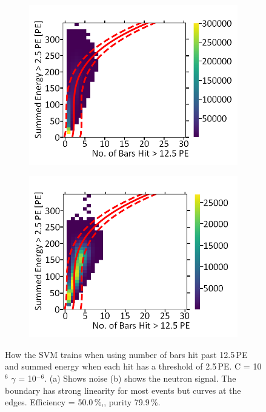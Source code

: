 \begin{figure}[!h]
\centering
\begin{subfigure}{.5\textwidth}
  \centering
  \includegraphics[width=\linewidth]{Appendix1/Figs/Bars2Sum1Noise.png}
  \captionsetup{width=.9\linewidth}
  \caption{}
  \label{subFig:Bars2Sum1Noise}
\end{subfigure}%
\begin{subfigure}{.5\textwidth}
  \centering
\includegraphics[width=\linewidth]{Appendix1/Figs/Bars2Sum1Signal.png}
  \captionsetup{width=.9\linewidth}
  \caption{}
  \label{subFig:Bars2Sum1Signal}
\end{subfigure}
\caption[LIBLINEAR SVM Nyström approximated RBF kernel for number of bars hit > 12.5\,PE vs summed energy > 2.5\,PE.]{How the SVM trains when using number of bars hit past 12.5\,PE and summed energy when each hit has a threshold of 2.5\,PE. C = 10$^6$ $\gamma$ = 10$^{-6}$. (a) Shows noise (b) shows the neutron signal. The boundary has strong linearity for most events but curves at the edges. Efficiency = 50.0\,\%,, purity 79.9\,\%.}
\label{fig:Bars2Sum1SignalNoise}
\end{figure}

